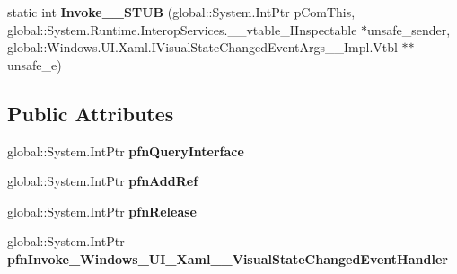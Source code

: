 \begin{DoxyCompactItemize}
\item 
\mbox{\label{struct_windows_1_1_u_i_1_1_xaml_1_1_visual_state_changed_event_handler_____impl_1_1_vtbl_a887532d06ced4e54c6c49a357110b3d8}} 
static int {\bfseries Invoke\+\_\+\+\_\+\+S\+T\+UB} (global\+::\+System.\+Int\+Ptr p\+Com\+This, global\+::\+System.\+Runtime.\+Interop\+Services.\+\_\+\+\_\+vtable\+\_\+\+I\+Inspectable $\ast$unsafe\+\_\+sender, global\+::\+Windows.\+U\+I.\+Xaml.\+I\+Visual\+State\+Changed\+Event\+Args\+\_\+\+\_\+\+Impl.\+Vtbl $\ast$$\ast$unsafe\+\_\+e)
\end{DoxyCompactItemize}
\subsection*{Public Attributes}
\begin{DoxyCompactItemize}
\item 
\mbox{\label{struct_windows_1_1_u_i_1_1_xaml_1_1_visual_state_changed_event_handler_____impl_1_1_vtbl_aac86272367924a8b1ae0ef77c8b67c9a}} 
global\+::\+System.\+Int\+Ptr {\bfseries pfn\+Query\+Interface}
\item 
\mbox{\label{struct_windows_1_1_u_i_1_1_xaml_1_1_visual_state_changed_event_handler_____impl_1_1_vtbl_a243ef58e161a03f8ddfdaf4c791280c1}} 
global\+::\+System.\+Int\+Ptr {\bfseries pfn\+Add\+Ref}
\item 
\mbox{\label{struct_windows_1_1_u_i_1_1_xaml_1_1_visual_state_changed_event_handler_____impl_1_1_vtbl_a38417ac95be02bb46b5e33deaf07ff49}} 
global\+::\+System.\+Int\+Ptr {\bfseries pfn\+Release}
\item 
\mbox{\label{struct_windows_1_1_u_i_1_1_xaml_1_1_visual_state_changed_event_handler_____impl_1_1_vtbl_a4f0457359789b62c6ba810d06fc81826}} 
global\+::\+System.\+Int\+Ptr {\bfseries pfn\+Invoke\+\_\+\+Windows\+\_\+\+U\+I\+\_\+\+Xaml\+\_\+\+\_\+\+Visual\+State\+Changed\+Event\+Handler}
\end{DoxyCompactItemize}
